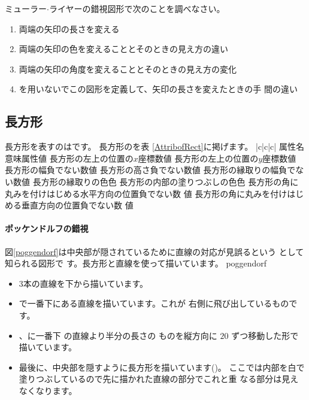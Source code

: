 \begin{Problem}\upshape
ミューラー$\cdot$ライヤーの錯視図形で次のことを調べなさい。
\begin{enumerate}
 \item 両端の矢印の長さを変える
 \item 両端の矢印の色を変えることとそのときの見え方の違い
 \item 両端の矢印の角度を変えることとそのときの見え方の変化
 \item {}を用いないでこの図形を定義して、矢印の長さを変えたときの手
       間の違い
\end{enumerate}
\end{Problem}
\subsection{長方形}
長方形を表すのはです。
長方形のを表
       \ref{AttribofRect}に掲げます。
{|c|c|c|}{%
{属性名}{意味}{属性値}
{}{長方形の左上の位置の$x$座標}{数値}
{}{長方形の左上の位置の$y$座標}{数値}
{}{長方形の幅}{負でない数値}
{}{長方形の高さ}{負でない数値}
{}{長方形の縁取りの幅}{負でない数値}
{}{長方形の縁取りの色}{色}
{}{長方形の内部の塗りつぶしの色}{色}
{}{長方形の角に丸みを付けはじめる水平方向の位置}{負でない数
値}
{}{長方形の角に丸みを付けはじめる垂直方向の位置}{負でない数
値}
}
\paragraph{ポッケンドルフの錯視}
 図\ref{poggendorf}は中央部が隠されているために直線の対応が見誤るという
として知られる図形で
 す。長方形と直線を使って描いています。
{poggendorf}
\begin{itemize}
 \item 3本の直線を下から描いています。
 \item {}で一番下にある直線を描いています。これが
       右側に飛び出しているものです。
 \item {}、に一番下
       の直線より半分の長さの
       ものを縦方向に $20$ ずつ移動した形で描いています。
 \item 最後に、中央部を隠すように長方形を描いています()。
       ここでは内部を白で塗りつぶしているので先に描かれた直線の部分でこれと重
       なる部分は見えなくなります。
\end{itemize}

